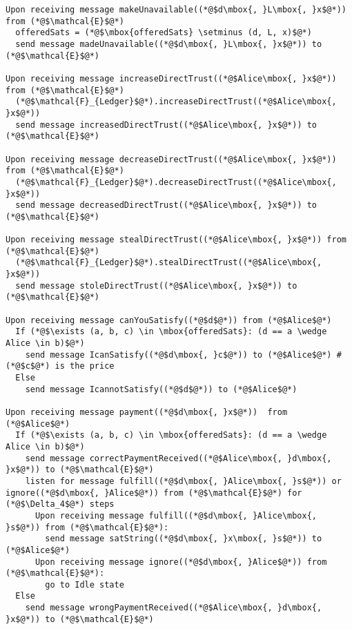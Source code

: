 \begin{lstlisting}[label=protocol, style=numbers]
Upon receiving message makeUnavailable((*@$d\mbox{, }L\mbox{, }x$@*)) from (*@$\mathcal{E}$@*)
  offeredSats = (*@$\mbox{offeredSats} \setminus (d, L, x)$@*)
  send message madeUnavailable((*@$d\mbox{, }L\mbox{, }x$@*)) to (*@$\mathcal{E}$@*)

Upon receiving message increaseDirectTrust((*@$Alice\mbox{, }x$@*)) from (*@$\mathcal{E}$@*)
  (*@$\mathcal{F}_{Ledger}$@*).increaseDirectTrust((*@$Alice\mbox{, }x$@*))
  send message increasedDirectTrust((*@$Alice\mbox{, }x$@*)) to (*@$\mathcal{E}$@*)

Upon receiving message decreaseDirectTrust((*@$Alice\mbox{, }x$@*)) from (*@$\mathcal{E}$@*)
  (*@$\mathcal{F}_{Ledger}$@*).decreaseDirectTrust((*@$Alice\mbox{, }x$@*))
  send message decreasedDirectTrust((*@$Alice\mbox{, }x$@*)) to (*@$\mathcal{E}$@*)

Upon receiving message stealDirectTrust((*@$Alice\mbox{, }x$@*)) from (*@$\mathcal{E}$@*)
  (*@$\mathcal{F}_{Ledger}$@*).stealDirectTrust((*@$Alice\mbox{, }x$@*))
  send message stoleDirectTrust((*@$Alice\mbox{, }x$@*)) to (*@$\mathcal{E}$@*)

Upon receiving message canYouSatisfy((*@$d$@*)) from (*@$Alice$@*)
  If (*@$\exists (a, b, c) \in \mbox{offeredSats}: (d == a \wedge Alice \in b)$@*)
    send message IcanSatisfy((*@$d\mbox{, }c$@*)) to (*@$Alice$@*) # (*@$c$@*) is the price
  Else
    send message IcannotSatisfy((*@$d$@*)) to (*@$Alice$@*)

Upon receiving message payment((*@$d\mbox{, }x$@*))  from (*@$Alice$@*)
  If (*@$\exists (a, b, c) \in \mbox{offeredSats}: (d == a \wedge Alice \in b)$@*)
    send message correctPaymentReceived((*@$Alice\mbox{, }d\mbox{, }x$@*)) to (*@$\mathcal{E}$@*)
    listen for message fulfill((*@$d\mbox{, }Alice\mbox{, }s$@*)) or ignore((*@$d\mbox{, }Alice$@*)) from (*@$\mathcal{E}$@*) for (*@$\Delta_4$@*) steps
      Upon receiving message fulfill((*@$d\mbox{, }Alice\mbox{, }s$@*)) from (*@$\mathcal{E}$@*):
        send message satString((*@$d\mbox{, }x\mbox{, }s$@*)) to (*@$Alice$@*)
      Upon receiving message ignore((*@$d\mbox{, }Alice$@*)) from (*@$\mathcal{E}$@*):
        go to Idle state
  Else
    send message wrongPaymentReceived((*@$Alice\mbox{, }d\mbox{, }x$@*)) to (*@$\mathcal{E}$@*)
\end{lstlisting}
